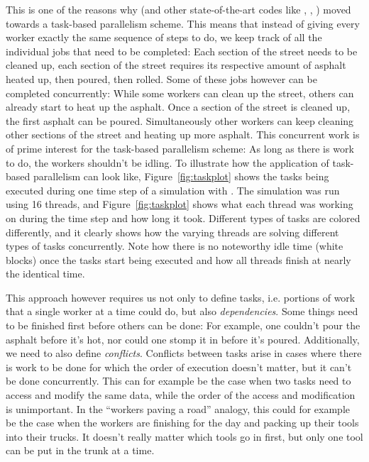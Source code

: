This is one of the reasons why \swift (and other state-of-the-art codes like
\cite{stoneAthenaAdaptiveMesh2020}, \cite{wadsleyGasoline2ModernSmoothed2017},
\cite{menonAdaptiveTechniquesClustered2015})  moved towards a task-based parallelism scheme. This
means that instead of giving every worker exactly the same sequence of steps to do, we keep track of
all the individual jobs that need to be completed: Each section of the street needs to be cleaned
up, each section of the street requires its respective amount of asphalt heated up, then poured,
then rolled. Some of these jobs however can be completed concurrently: While some workers can clean
up the street, others can already start to heat up the asphalt. Once a section of the street is
cleaned up, the first asphalt can be poured. Simultaneously other workers can keep cleaning other
sections of the street and heating up more asphalt. This concurrent work is of prime interest for
the task-based parallelism scheme: As long as there is work to do, the workers shouldn't be idling.
To illustrate how the application of task-based parallelism can look like, Figure~\ref{fig:taskplot}
shows the tasks being executed during one time step of a simulation with \swift. The simulation was
run using 16 threads, and Figure~\ref{fig:taskplot} shows what each thread was working on during the
time step and how long it took. Different types of tasks are colored differently, and it clearly
shows how the varying threads are solving different types of tasks concurrently. Note how there is
no noteworthy idle time (white blocks) once the tasks start being executed and how all threads
finish at nearly the identical time.


This approach however requires us not only to define tasks, i.e. portions of work that a single
worker at a time could do, but also \emph{dependencies}. Some things need to be finished first
before others can be done: For example, one couldn't pour the asphalt before it's hot, nor could one
stomp it in before it's poured. Additionally, we need to also define \emph{conflicts}. Conflicts
between tasks arise in cases where there is work to be done for which the order of execution
doesn't matter, but it can't be done concurrently. This can for example be the case when two tasks
need to access and modify the same data, while the order of the access and modification is
unimportant. In the ``workers paving a road'' analogy, this could for example be the case when the
workers are finishing for the day and packing up their tools into their trucks. It doesn't really
matter which tools go in first, but only one tool can be put in the trunk at a time.

